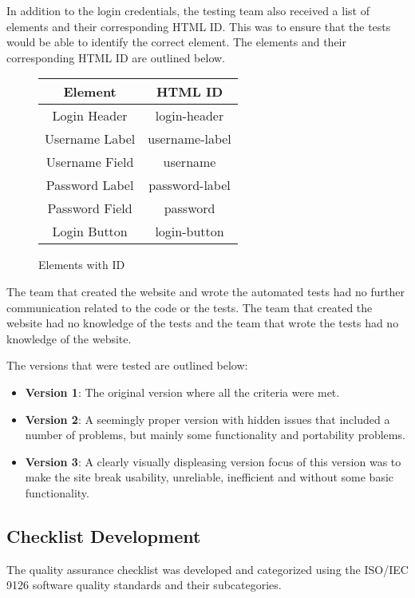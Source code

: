 \documentclass[journal,twocolumn]{IEEEtran}
\begin{document}
In addition to the login credentials, the testing team also received a list of elements and their corresponding HTML ID. This was to ensure that the tests would be able to identify the correct element. The elements and their corresponding HTML ID are outlined below.

\begin{figure}[h!]
    \centering
    \begin{tabular}{|c|c|}
        \hline
        \textbf{Element} & \textbf{HTML ID} \\ \hline
        Login Header     & login-header     \\ \hline
        Username Label   & username-label   \\ \hline
        Username Field   & username         \\ \hline
        Password Label   & password-label   \\ \hline
        Password Field   & password         \\ \hline
        Login Button     & login-button     \\ \hline
    \end{tabular}
    \captionsetup{justification=centering}
    \caption{Elements with ID}
\end{figure}

The team that created the website and wrote the automated tests had no further communication related to the code or the tests. The team that created the website had no knowledge of the tests and the team that wrote the tests had no knowledge of the website.

The versions that were tested are outlined below:
\begin{itemize}
    \item \textbf{Version 1}: The original version where all the criteria were met.
    \item \textbf{Version 2}: A seemingly proper version with hidden issues that included a number of problems, but mainly some functionality and portability problems.
    \item \textbf{Version 3}: A clearly visually displeasing version focus of this version was to make the site break usability, unreliable, inefficient and without some basic functionality.
\end{itemize}

\subsection{Checklist Development}
The quality assurance checklist was developed and categorized using the ISO/IEC 9126 software quality standards and their subcategories.
\end{document}
